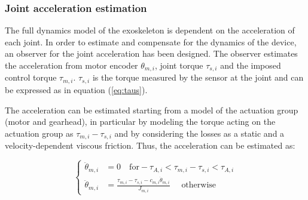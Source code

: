 \documentclass[journal]{IEEEtran}
\begin{document}




\subsubsection{Joint acceleration estimation}  \label{acc_observer}

The full dynamics model of the exoskeleton  is dependent on the acceleration of each joint. In order to estimate and compensate for the dynamics of the device, an observer for the joint acceleration has been designed. 
The observer estimates the acceleration from motor encoder $\theta_{m,i}$,  joint torque $\tau_{s,i}$ and the imposed control torque $\tau_{m,i}$.
$\tau_{s,i}$ is the torque measured by the sensor at the joint and can be expressed as in equation (\ref{eq:taus}).

The acceleration can be estimated starting from a model of the actuation group (motor and gearhead), in particular by modeling the torque acting on the actuation group as $\tau_{m,i}-\tau_{s,i}$ and by considering the losses as a static and a velocity-dependent viscous friction. Thus, the acceleration can be estimated as:




\begin{equation}
\left \{
\begin{aligned}
\ddot{\theta}_{m,i} & =0 \quad \text{for} -\tau_{A,i}<\tau_{m,i}-\tau_{s,i}<\tau_{A,i} \\
\ddot{\theta}_{m,i} & =\frac{\tau_{m,i}-\tau_{s,i}  -c_{m,i}\dot{\theta}_{m,i}}{J_{m,i}} \quad \text{ otherwise}
\end{aligned}
\right .
\label{tau_acc}
\end{equation}
\end{document}
